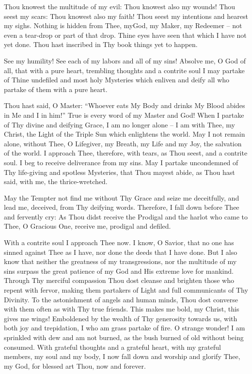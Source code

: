 Thou knowest the multitude of my evil: Thou knowest also my wounds! Thou seest my scars: Thou knowest also my faith! Thou seest my intentions and hearest my sighs. Nothing is hidden from Thee, myGod, my Maker, my Redeemer -- not even a tear-drop or part of that drop. Thine eyes have seen that which I have not yet done. Thou hast inscribed in Thy book things yet to happen.

See my humility! See each of my labors and all of my sins! Absolve me, O God of all, that with a pure heart, trembling thoughts and a contrite soul I may partake of Thine undefiled and most holy Mysteries which enliven and deify all who partake of them with a pure heart.

Thou hast said, O Master: ``Whoever eats My Body and drinks My Blood abides in Me and I in him!'' True is every word of my Master and God! When I partake of Thy divine and deifying Grace, I am no longer alone -- I am with Thee, my Christ, the Light of the Triple Sun which enlightens the world. May I not remain alone, without Thee, O Lifegiver, my Breath, my Life and my Joy, the salvation of the world. I approach Thee, therefore, with tears, as Thou seest, and a contrite soul. I beg to receive deliverance from my sins. May I partake uncondemned of Thy life-giving and spotless Mysteries, that Thou mayest abide, as Thou hast said, with me, the thrice-wretched.

May the Tempter not find me without Thy Grace and seize me deceitfully, and lead me, deceived, from Thy deifying words. Therefore, I fall down before Thee and fervently cry: As Thou didst receive the Prodigal and the harlot who came to Thee, O Gracious One, receive me, prodigal and defiled.

With a contrite soul I approach Thee now. I know, O Savior, that no one has sinned against Thee as I have, nor done the deeds that I have done. But I also know that neither the greatness of my transgressions, nor the multitude of my sins surpass the great patience of my God and His extreme love for mankind. Through Thy merciful compassion Thou dost cleanse and brighten those who repent with fervor, making them partakers of Light and full communicants of Thy Divinity. To the astonishment of angels and human minds, Thou dost converse with them often as with Thy true friends. This makes me bold, my Christ, this gives me wings! Emboldened by the wealth of Thy generosity towards us, with both joy and trepidation, I who am grass partake of fire. O strange wonder! I am sprinkled with dew and am not burned, as the bush burned of old without being consumed. With grateful thoughts and a grateful heart, with my grateful members, my soul and my body, I now fall down and worship and glorify Thee, my God, for blessed art Thou, now and forever.

